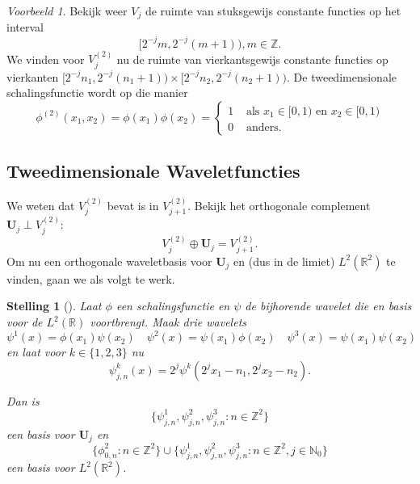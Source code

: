 \documentclass[11pt]{report}
\newcommand{\R}{\mathbb{R}}
\newcommand{\N}{\mathbb{N}}
\newcommand{\Z}{\mathbb{Z}}
\theoremstyle{plain}
\newtheorem*{stelling}{Stelling}
\theoremstyle{remark}
\newtheorem*{voorbeeld}{Voorbeeld}
\begin{document}
\begin{voorbeeld}
Bekijk weer $V_j$ de ruimte van stuksgewijs constante functies op het interval 
\[
 [2^{-j} m, 2^{-j}(m+1) ), m \in \Z.
\] 
We vinden voor $V_j^{(2)}$ nu de ruimte van vierkantsgewijs constante functies op vierkanten $[2^{-j}n_1, 2^{-j}(n_1+1)) \times [2^{-j}n_2, 2^{-j}(n_2+1))$. De tweedimensionale schalingsfunctie wordt op die manier
\[
	\phi^{(2)}(x_1,x_2) = \phi(x_1)\phi(x_2) = \begin{cases} 1 & \text{ als } x_1 \in [0,1)\text{ en }x_2 \in [0,1) \\ 0 & \text{ anders.} \end{cases}
\]
\end{voorbeeld}

\subsection{Tweedimensionale Waveletfuncties}
We weten dat $V_j^{(2)}$ bevat is in $V_{j+1}^{(2)}$. Bekijk het orthogonale complement $\boldsymbol{U}_j \perp V_j^{(2)}$:
\begin{equation}
  \label{2d_ruimte_rec}
	V_j^{(2)} \oplus \boldsymbol{U}_j = V_{j+1}^{(2)}.
\end{equation}
Om nu een orthogonale waveletbasis voor $\boldsymbol{U}_j$ en (dus in de limiet) $L^2(\R^2)$ te vinden, gaan we als volgt te werk.
\begin{stelling}[{\cite[T7.24]{mallat}}]
Laat $\phi$ een schalingsfunctie en $\psi$ de bijhorende wavelet die en basis voor de $L^2(\R)$ voortbrengt. Maak drie wavelets
\begin{equation}
\label{psi_k_defs}
	\psi^1(x) = \phi(x_1)\psi(x_2) \quad \psi^2(x) = \psi(x_1) \phi(x_2) \quad \psi^3(x) = \psi(x_1)\psi(x_2)
\end{equation}
en laat voor $k \in \{1,2,3\}$ nu
\[
	\psi^k_{j,n}(x) = 2^j \psi^k\left( 2^jx_1 - n_1, 2^j x_2 - n_2 \right).
\]

Dan is 
\[
	\{ \psi^1_{j,n}, \psi^2_{j,n}, \psi^3_{j,n}: n \in \Z^2 \}
\] een basis voor $\boldsymbol{U}_j$ 
en 
\[
  \{ \phi_{0, n}^2: n \in \Z^2 \} \cup \{ \psi^1_{j,n}, \psi^2_{j,n}, \psi^3_{j,n}: n \in \Z^2, j \in \N_0 \}
\] een basis voor $L^2(\R^2)$.
\end{stelling}
\end{document}
